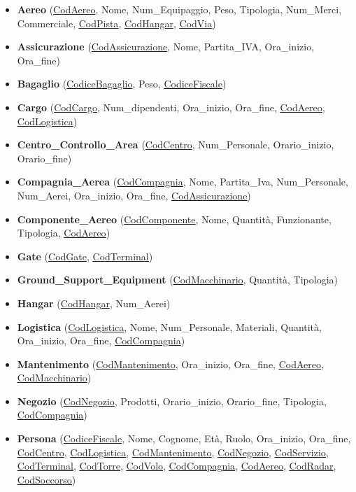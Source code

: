 \begin{itemize}
	\item \textbf{\small Aereo} \textsf{\small (\underline{CodAereo}, Nome, Num\_Equipaggio, Peso, Tipologia, Num\_Merci, Commerciale, \underline{\underline{CodPista}}, \underline{\underline{CodHangar}}, \underline{\underline{CodVia}})}
	\item \textbf{\small Assicurazione} \textsf{\small (\underline{CodAssicurazione}, Nome, Partita\_IVA, Ora\_inizio, Ora\_fine)}
	\item \textbf{\small Bagaglio} \textsf{\small (\underline{CodiceBagaglio}, Peso, \underline{\underline{CodiceFiscale}})}
	\item \textbf{\small Cargo} \textsf{\small (\underline{CodCargo}, Num\_dipendenti, Ora\_inizio, Ora\_fine, \underline{\underline{CodAereo}}, \underline{\underline{CodLogistica}})}
	\item \textbf{\small Centro\_Controllo\_Area} \textsf{\small (\underline{CodCentro}, Num\_Personale, Orario\_inizio, Orario\_fine)}
	\item \textbf{\small Compagnia\_Aerea} \textsf{\small (\underline{CodCompagnia}, Nome, Partita\_Iva, Num\_Personale, Num\_Aerei, Ora\_inizio, Ora\_fine, \underline{\underline{CodAssicurazione}})}
	\item \textbf{\small Componente\_Aereo} \textsf{\small (\underline{CodComponente}, Nome, Quantità, Funzionante, Tipologia, \underline{\underline{CodAereo}})}
	\item \textbf{\small Gate} \textsf{\small (\underline{CodGate}, \underline{\underline{CodTerminal}})}
	\item \textbf{\small Ground\_Support\_Equipment} \textsf{\small (\underline{CodMacchinario}, Quantità, Tipologia)}
	\item \textbf{\small Hangar} \textsf{\small (\underline{CodHangar}, Num\_Aerei)}
	\item \textbf{\small Logistica} \textsf{\small (\underline{CodLogistica}, Nome, Num\_Personale, Materiali, Quantità, Ora\_inizio, Ora\_fine, \underline{\underline{CodCompagnia}})}
	\item \textbf{\small Mantenimento} \textsf{\small (\underline{CodMantenimento}, Ora\_inizio, Ora\_fine, \underline{\underline{CodAereo}}, \underline{\underline{CodMacchinario}})}
	\item \textbf{\small Negozio} \textsf{\small (\underline{CodNegozio}, Prodotti, Orario\_inizio, Orario\_fine, Tipologia, \underline{\underline{CodCompagnia}})}
	\item \textbf{\small Persona} \textsf{\small (\underline{CodiceFiscale}, Nome, Cognome, Età, Ruolo, Ora\_inizio, Ora\_fine, \underline{\underline{CodCentro}}, \underline{\underline{CodLogistica}}, \underline{\underline{CodMantenimento}}, \underline{\underline{CodNegozio}}, \underline{\underline{CodServizio}}, \underline{\underline{CodTerminal}}, \underline{\underline{CodTorre}}, \underline{\underline{CodVolo}}, \underline{\underline{CodCompagnia}}, \underline{\underline{CodAereo}}, \underline{\underline{CodRadar}}, \underline{\underline{CodSoccorso}})}

\end{itemize}

